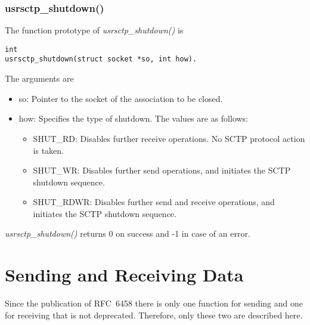 \documentclass[a4paper]{article}
\begin{document}
\subsubsection{usrsctp\_shutdown()} 
The function prototype of \textit{usrsctp\_shutdown()} is 
\begin{verbatim}   
int
usrsctp_shutdown(struct socket *so, int how).
\end{verbatim}
The arguments are
\begin{itemize}
\item so: Pointer to the socket of the association to be closed.
\item how: Specifies the type of shutdown.  The values are as follows:
\begin{itemize}
\item SHUT\_RD:  Disables further receive operations.  No SCTP protocol
         action is taken.
\item SHUT\_WR:  Disables further send operations, and initiates the SCTP
         shutdown sequence.
\item SHUT\_RDWR:  Disables further send and receive operations, and
         initiates the SCTP shutdown sequence.
\end{itemize}
\end{itemize}
\textit{usrsctp\_shutdown()} returns 0 on success and -1 in case of an error.

\section{Sending and Receiving Data}
Since the publication of RFC~6458 there is only one function for sending and one for receiving
that is not deprecated. Therefore, only these two are described here.
\end{document}
